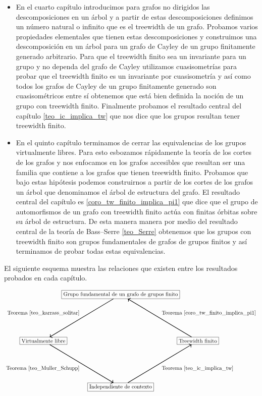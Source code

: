 \documentclass[tesis.tex]{subfiles}
\begin{document}
\begin{itemize}
		\item 
			En el cuarto capítulo introducimos para grafos no dirigidos las descomposiciones en un árbol y a partir de estas descomposiciones definimos un número natural o infinito que es el treewidth de un grafo.
			Probamos varios propiedades elementales que tienen estas descomposiciones y construimos una descomposición en un árbol para un grafo de Cayley de un grupo finitamente generado arbitrario.
			Para que el treewidth finito sea un invariante para un grupo y no dependa del grafo de Cayley utilizamos cuasisometrías para probar que el treewidth finito es un invariante por cuasisometría y así como todos los grafos de Cayley de un grupo finitamente generado son cuasisométricos entre sí obtenemos que está bien definida la noción de un grupo con treewidth finito.
			Finalmente probamos el resultado central del capítulo \ref{teo_ic_implica_tw} que nos dice que los grupos \ic resultan tener treewidth finito.
			
		\item 
			En el quinto capítulo terminamos de cerrar las equivalencias de los grupos virtualmente libres.
			Para esto esbozamos rápidamente la teoría de los cortes de los grafos y nos enfocamos en los grafos accesibles que resultan ser una familia que contiene a los grafos que tienen treewidth finito.
			Probamos que bajo estas hipótesis podemos construirnos a partir de los cortes de los grafos un árbol que denominamos el árbol de estructura del grafo.
			El resultado central del capítulo es \ref{coro_tw_finito_implica_pi1} que dice que el grupo de automorfismos de un grafo con treewidth finito actúa con finitas órbitas sobre su árbol de estructura. 
			De esta manera manera por medio del resultado central de la teoría de Bass--Serre  \ref{teo_Serre} obtenemos que los grupos con treewidth finito son grupos fundamentales de grafos de grupos finitos y así terminamos de probar todas estas equivalencias.
	\end{itemize}
		
	
	
	
	El siguiente esquema muestra las relaciones que existen entre los resultados probados en cada capítulo.
	
	\[	
	\begin{tikzpicture}
		\path 
		(0,0) node(a) [rectangle,draw] {Grupo fundamental de un grafo de grupos finito}
		(5,-3) node(b) [rectangle,draw] {Treewidth finito}
		(0,-6) node(c) [rectangle,draw] {Independiente de contexto}
		(-5,-3) node (d) [rectangle,draw] {Virtualmente libre};
		\draw   
		(d) edge[<-,line width=1.0pt,"Teorema \ref{teo_karrass_solitar}"] (a) 
		(c) edge[<-,line width=1.0pt,"Teorema \ref{teo_Muller_Schupp}"] (d)
		(b) edge[<-,line width=1.0pt,"Teorema \ref{teo_ic_implica_tw}"] (c)
		(a)  edge[<-,line width=1.0pt,"Teorema \ref{coro_tw_finito_implica_pi1}"] (b);
	\end{tikzpicture}
	\]
	
	
	
	
	
	
	
\end{document}
